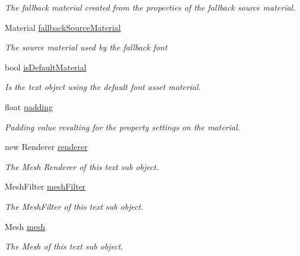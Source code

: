 \begin{DoxyCompactItemize}
\begin{DoxyCompactList}\small\item\em The fallback material created from the properties of the fallback source material. \end{DoxyCompactList}\item 
Material \mbox{\hyperlink{class_t_m_pro_1_1_t_m_p___sub_mesh_a323c171d10bb001f23b750d9404b68a8}{fallback\+Source\+Material}}
\begin{DoxyCompactList}\small\item\em The source material used by the fallback font \end{DoxyCompactList}\item 
bool \mbox{\hyperlink{class_t_m_pro_1_1_t_m_p___sub_mesh_a5eaf8dd69cecbc5c96bcc5ea3b8489ef}{is\+Default\+Material}}
\begin{DoxyCompactList}\small\item\em Is the text object using the default font asset material. \end{DoxyCompactList}\item 
float \mbox{\hyperlink{class_t_m_pro_1_1_t_m_p___sub_mesh_adc8e38d6679306c54598bf48db166a3f}{padding}}
\begin{DoxyCompactList}\small\item\em Padding value resulting for the property settings on the material. \end{DoxyCompactList}\item 
new Renderer \mbox{\hyperlink{class_t_m_pro_1_1_t_m_p___sub_mesh_a5eebffcd056afe0d3be79f30d611d780}{renderer}}
\begin{DoxyCompactList}\small\item\em The Mesh Renderer of this text sub object. \end{DoxyCompactList}\item 
Mesh\+Filter \mbox{\hyperlink{class_t_m_pro_1_1_t_m_p___sub_mesh_aa4bffef3b3907fab7cf2b3c7c632af3b}{mesh\+Filter}}
\begin{DoxyCompactList}\small\item\em The Mesh\+Filter of this text sub object. \end{DoxyCompactList}\item 
Mesh \mbox{\hyperlink{class_t_m_pro_1_1_t_m_p___sub_mesh_ad6a306d193c7be147604ca07bbd9eb8b}{mesh}}
\begin{DoxyCompactList}\small\item\em The Mesh of this text sub object. \end{DoxyCompactList}\end{DoxyCompactItemize}


